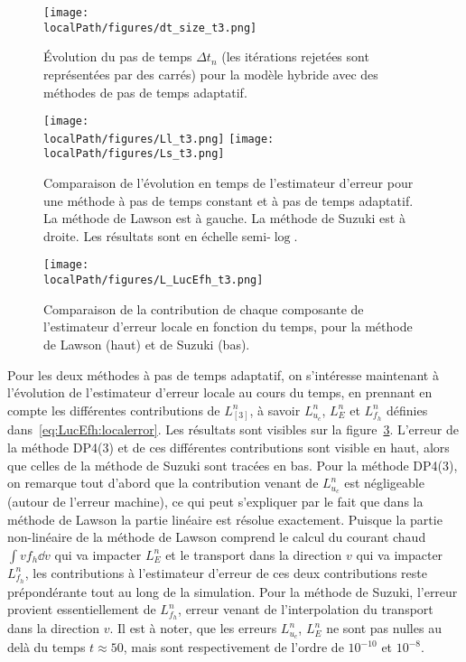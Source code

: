 \begin{figure}[h]
  \centering
  \texttt{[image: \\localPath/figures/dt\_size\_t3.png]}
  \caption{Évolution du pas de temps $\Delta t_n$ (les itérations rejetées sont représentées par des carrés) pour la modèle hybride avec des méthodes de pas de temps adaptatif.} 
  \label{fig:compare:dt_and_error}
\end{figure}

\begin{figure}[h]
  \centering
  \texttt{[image: \\localPath/figures/Ll\_t3.png]}
  \texttt{[image: \\localPath/figures/Ls\_t3.png]}
  \caption{Comparaison de l'évolution en temps de l'estimateur d'erreur pour une méthode à pas de temps constant et à pas de temps adaptatif. La méthode de Lawson est à gauche. La méthode de Suzuki est à droite. Les résultats sont en échelle semi-$\log$.}
  \label{fig:compare:error:dtc}
\end{figure}
\begin{figure}[h]
  \centering
  \texttt{[image: \\localPath/figures/L\_LucEfh\_t3.png]}
  \caption{Comparaison de la contribution de chaque composante de l'estimateur d'erreur locale en fonction du temps, pour la méthode de Lawson (haut) et de Suzuki (bas).}
  \label{fig:compare:error:LucEfh}
\end{figure}

Pour les deux méthodes à pas de temps adaptatif, on s'intéresse maintenant à l'évolution de l'estimateur d'erreur locale au cours du temps, en prennant en compte les différentes contributions de $L^n_{[3]}$, à savoir $L^n_{u_c}$, $L^n_{E}$ et $L^n_{f_h}$ définies dans~\eqref{eq:LucEfh:localerror}. Les résultats sont visibles sur la figure~\ref{fig:compare:error:LucEfh}. L'erreur de la méthode DP4(3) et de ces différentes contributions sont visible en haut, alors que celles de la méthode de Suzuki sont tracées en bas. Pour la méthode DP4(3), on remarque tout d'abord que la contribution venant de $L^n_{u_c}$ est négligeable (autour de l'erreur machine), ce qui peut s'expliquer par le fait que dans la méthode de Lawson la partie linéaire est résolue exactement. Puisque la partie non-linéaire de la méthode de Lawson comprend le calcul du courant chaud $\int vf_h\dd{v}$ qui va impacter $L^n_E$ et le transport dans la direction $v$ qui va impacter $L^n_{f_h}$, les contributions à l'estimateur d'erreur de ces deux contributions reste prépondérante tout au long de la simulation. Pour la méthode de Suzuki, l'erreur provient essentiellement de $L^n_{f_h}$, erreur venant de l'interpolation du transport dans la direction $v$. Il est à noter, que les erreurs $L^n_{u_c}$, $L^n_{E}$ ne sont pas nulles au delà du temps $t\approx 50$, mais sont respectivement de l'ordre de $10^{-10}$ et $10^{-8}$.

